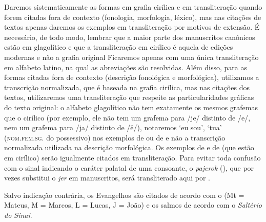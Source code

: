 Daremos sistematicamente as formas em grafia cirílica e em transliteração quando
forem citadas fora de contexto (fonologia, morfologia, léxico), mas nas
citações de textos apenas daremos os exemplos em transliteração por motivos de extensão.
É necessário, de todo modo, lembrar que a maior parte dos manuscritos canônicos
estão em glagolítico e que a transliteração em cirílico é aquela de edições
modernas e não a grafia original
Ficaremos apenas com uma única transliteração em alfabeto latino, na qual as
abreviações são resolvidas.
Além disso, para as formas citadas fora de contexto (descrição fonológica e
morfológica), utilizamos a transcrição normalizada, que é baseada na grafia
cirílica, mas nas citações dos textos, utilizaremos uma transliteração que
respeite as particularidades gráficas do texto original: o alfabeto glagolítico
não tem exatamente os mesmos grafemas que o cirílico (por exemplo, ele não tem
um grafema para /je/ distinto de /e/, nem um grafema para /ja/ distinto de /ě/),
notaremos  `eu sou',  `tua' (\textsc{nom.fem.sg.} do
possessivo) nos exemplos de  ou de  e não a transcrição
normalizada   utilizada na descrição morfológica.
Os exemplos de  e de  (que estão em cirílico) serão
igualmente citados em transliteração.
Para evitar toda confusão com o sinal  indicando o caráter palatal de
uma consoante, o \emph{pajerok} (), que por vezes substitui o
\emph{jer} em manuscritos, será transliterado aqui por .

Salvo indicação contrária, os Evangelhos são citados de acordo com o
 (Mt = Mateus, M = Marcos, L = Lucas, J = João) e os salmos de
acordo com o \emph{Saltério do Sinai}.

